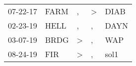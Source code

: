 \begin{supertabular}{p{0.07\textwidth}p{0.06\textwidth}p{0.02\textwidth}p{0.02\textwidth}p{0.06\textwidth}}
          07-22-17\textsuperscript{} &           FARM\textsuperscript{} &             , &  \textgreater &           DIAB\textsuperscript{} \\
          02-23-19\textsuperscript{} &           HELL\textsuperscript{} &             , &             , &           DAYN\textsuperscript{} \\
          03-07-19\textsuperscript{} &           BRDG\textsuperscript{} &  \textgreater &             , &            WAP\textsuperscript{} \\
          08-24-19\textsuperscript{} &            FIR\textsuperscript{} &  \textgreater &             , &           sol1\textsuperscript{} \\
\end{supertabular}
